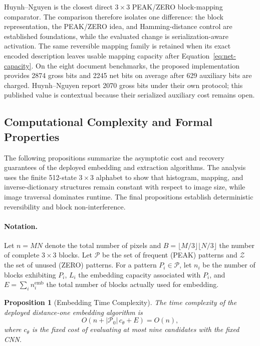 \documentclass[a4paper,fleqn]{cas-dc}
\newtheorem{proposition}{Proposition}[section]
\begin{document}
Huynh--Nguyen \cite{Huynh2025BlockMapping} is the closest direct
$3\times3$ PEAK/ZERO block-mapping comparator. The comparison therefore
isolates one difference: the block representation, the PEAK/ZERO idea, and
Hamming-distance control are established foundations, while the evaluated
change is serialization-aware activation. The same reversible mapping family is
retained when its exact encoded description leaves usable mapping capacity after
Equation~\ref{eq:net-capacity}. On the eight document benchmarks, the proposed
implementation provides 2874 gross bits and 2245 net bits on average after 629
auxiliary bits are charged. Huynh--Nguyen report 2070 gross bits under their
own protocol; this published value is contextual because
their serialized auxiliary cost remains open.

\subsection{Computational Complexity and Formal Properties}
\label{subsec:complexity-analysis}

The following propositions summarize the asymptotic cost and recovery
guarantees of the deployed embedding and extraction algorithms. The analysis
uses the finite 512-state $3\times3$ alphabet to show that histogram, mapping,
and inverse-dictionary structures remain constant with respect to image size,
while image traversal dominates runtime. The final propositions establish
deterministic reversibility and block non-interference.

\paragraph{Notation.}
Let $n=MN$ denote the total number of pixels and
$B=\lfloor M/3\rfloor\lfloor N/3\rfloor$ the number of complete
$3\times3$ blocks.
Let $\mathcal{P}$ be the set of frequent (PEAK) patterns and
$\mathcal{Z}$ the set of unused (ZERO) patterns.
For a pattern $P_i \in \mathcal{P}$, let $n_i$ be the number of blocks
exhibiting $P_i$, $L_i$ the embedding capacity associated with $P_i$, and
$E = \sum_i n_i^{\text{emb}}$ the total number of blocks actually used for
embedding.

\begin{proposition}[Embedding Time Complexity]
The time complexity of the deployed distance-one embedding algorithm is
\begin{equation}
O\!\left(n+|\mathcal P_0|\,c_\theta+E\right)=O(n),
\label{eq:embedding-complexity}
\end{equation}
where $c_\theta$ is the fixed cost of evaluating at most nine candidates with
the fixed CNN.
\end{proposition}
\end{document}
